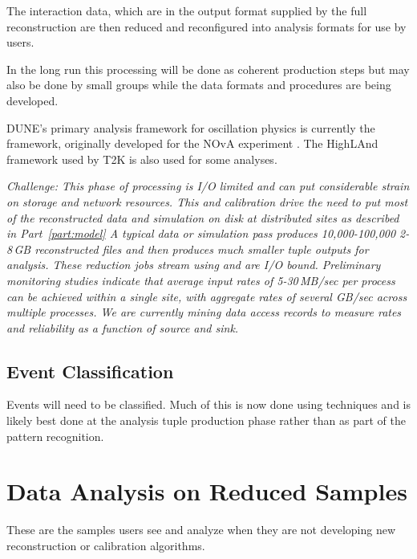 \documentclass[../main-v1.tex]{subfiles}
\begin{document}
The interaction data, which are in the output format supplied by the full reconstruction are then reduced and reconfigured into analysis formats for use by users. 

In the long run this processing will be done as coherent production steps but may also be done by small groups while the data formats and procedures are being developed.

DUNE's primary analysis framework for oscillation physics is currently   the  framework, originally developed for the NOvA experiment \cite{Backhouse:2015wlj,  bib:cafana}. The HighLAnd framework used by T2K is also used for some analyses. 



{\it Challenge:  This phase of processing is I/O limited and can put considerable strain on storage and network resources.  This and calibration drive the need to put most of the reconstructed data and simulation on disk at distributed sites as described in Part~\ref{part:model}
A typical  data or simulation pass produces  10,000-100,000 2-8\,GB reconstructed files and  then produces much smaller tuple outputs for analysis.  These reduction jobs stream using  and are I/O bound. Preliminary monitoring studies indicate that average input rates of 5-30\,MB/sec per process can be achieved within a single site, with aggregate rates of several GB/sec across multiple processes. We are currently mining data access records to measure rates and reliability as a function of source and sink. }

\subsection{Event Classification}
Events will need to be classified.  Much of this is now done using  techniques and is likely best done at the analysis tuple production phase rather than as part of the pattern recognition. 



\section{Data Analysis on Reduced Samples }


These are the samples users see and analyze when they are not developing new reconstruction  or calibration algorithms. 
\end{document}
